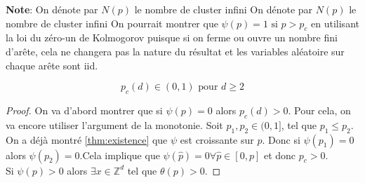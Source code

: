 \textbf{Note}:   
On dénote par $N(p)$ le nombre de cluster infini
On dénote par $N(p)$ le nombre de cluster infini
On pourrait montrer que $\psi(p) =1 \text{ si } p>p_c$ en utilisant la loi du zéro-un de Kolmogorov puisque si on ferme ou ouvre un nombre fini d'arête, cela ne changera pas la nature du résultat et les variables aléatoire sur chaque arête sont iid.
\begin{theorem}[]

    $$
    p_c(d) \in (0,1) \text{ pour $d\geq2$}
    $$
\end{theorem}
\begin{proof}
    On va d'abord montrer que si $\psi(p) = 0$ alors $p_c(d)>0$. Pour cela, on va encore utiliser l'argument de la monotonie. Soit $p_1,p_2 \in (0,1]$, tel que $p_1 \leq p_2$. On a déjà montré \ref{thm:existence} que $\psi$ est croissante sur $p$. Donc si $\psi(p_1) = 0$ alors $\psi(p_2) = 0$.Cela implique que $\psi(\hat{p}) = 0 \forall\hat{p} \in [0,p]$ et donc $p_c>0$.\\
    Si $\psi(p) > 0$ alors $\exists x \in \mathbb{Z}^d$ tel que $\theta(p)>0$.
\end{proof}
